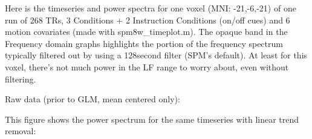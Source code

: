 \documentclass[12pt]{article}
\begin{document}
Here is the timeseries and power spectra for one voxel (MNI: -21,-6,-21) of one run of 268 TRs, 3 Conditions + 2 Instruction Conditions (on/off cues) and 6 motion covariates (made with spm8w\_timeplot.m). The opaque band in the Frequency domain graphs highlights the portion of the frequency spectrum typically filtered out by using a 128second filter (SPM's default). At least for this voxel, there’s not much power in the LF range to worry about, even without filtering.

\vspace{\baselineskip}
\noindent
Raw data (prior to GLM, mean centered only):

\vspace{\baselineskip}
\noindent%
\begin{minipage}{\linewidth}
\end{minipage}

\vspace{\baselineskip}
\noindent
This figure shows the power spectrum for the same timeseries with linear trend removal:
\end{document}
